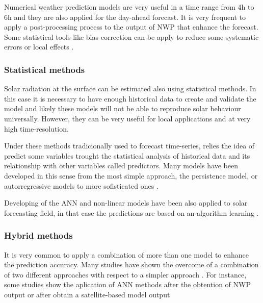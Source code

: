 Numerical weather prediction models are very useful in a time range from 4h to 6h and they are also applied for the day-ahead forecast. It is very frequent to apply a post-processing process to the output of NWP that enhance the forecast. Some statistical tools like bias correction can be apply to reduce some systematic errors or local effects \cite*{Diagne2013}.

\subsubsection{Statistical methods}

Solar radiation at the surface can be estimated also using statistical methods. In this case it is necessary to have enough historical data to create and validate the model and likely these models will not be able to reproduce solar behaviour universally. However, they can be very useful for local applications and at very high time-resolution.

Under these methods tradicionally used to forecast time-series, relies the idea of predict some variables trought the statistical analysis of historical data and its relationship with other variables called predictors. Many models have been developed in this sense from the most simple approach, the persistence model, or autorregressive models to more sofisticated ones \cite*{Reikard2009, bacher2009, Inman2013}. 

Developing of the ANN and non-linear models have been also applied to solar forecasting field, in that case the predictions are based on an algorithm learning \cite{Mellit2008}. 


\subsubsection{Hybrid methods}

It is very common to apply a combination of more than one model to enhance the prediction accuracy. Many studies have shown the overcome of a combination of two different approaches with respect to a simpler approach \cite*{Diagne2017, Yang2014}. For instance, some studies show the aplication of ANN methods after the obtention of NWP output \cite*{Cornaro2015} or after obtain a satellite-based model output \cite*{Marquez2013}\\ 

